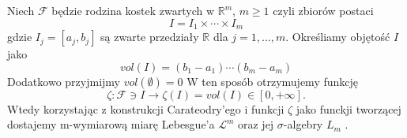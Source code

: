 \begin{defi}
	Niech $\mathcal{F}$ będzie rodzina kostek zwartych w $\mathbb{R}^m$, $m \geq 1$ czyli zbiorów postaci $$
		I = I_1 \times \cdots \times I_m
	$$gdzie $I_j=[a_j, b_j]$ są zwarte przedziały $\mathbb{R}$ dla $j = 1, \dots, m$. Określiamy objętość $I$ jako $$
		vol(I) = (b_1 - a_1) \cdots (b_m - a_m)
	$$
	Dodatkowo przyjmijmy $vol(\emptyset) = 0$\newline
	W ten sposób otrzymujemy funkcję $$
		\zeta: \mathcal{F} \ni I \rightarrow \zeta(I) = vol(I) \in [0, + \infty].
	$$
	Wtedy korzystając z konstrukcji Carateodry'ego i funkcji $\zeta$ jako funckji tworzącej dostajemy m-wymiarową miarę Lebesgue'a $\mathcal{L}^m$ oraz jej $\sigma$-algebry $L_m$ .
\end{defi}